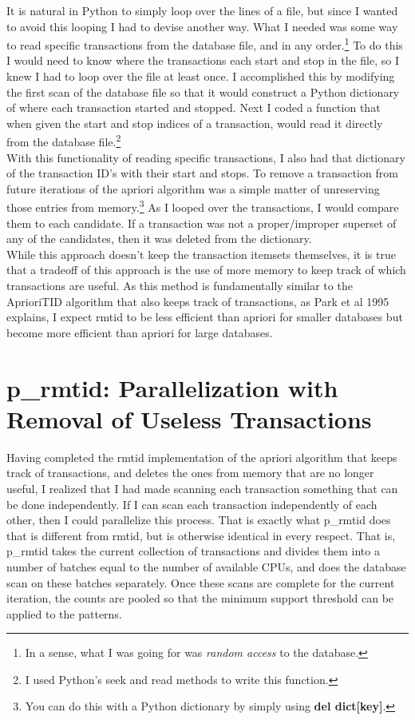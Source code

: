 \documentclass[12 pt]{article}
\begin{document}
It is natural in Python to simply loop over the lines of a file, but since I wanted to avoid this looping I had to devise another way. What I needed was some way to read specific transactions from the database file, and in any order.\footnote{In a sense, what I was going for was \textit{random access} to the database.} To do this I would need to know where the transactions each start and stop in the file, so I knew I had to loop over the file at least once. I accomplished this by modifying the first scan of the database file so that it would construct a Python dictionary of where each transaction started and stopped. Next I coded a function that when given the start and stop indices of a transaction, would read it directly from the database file.\footnote{I used Python's seek and read methods to write this function.}\\

With this functionality of reading specific transactions, I also had that dictionary of the transaction ID's with their start and stops. To remove a transaction from future iterations of the apriori algorithm was a simple matter of unreserving those entries from memory.\footnote{You can do this with a Python dictionary by simply using \textbf{del dict[key]}.} As I looped over the transactions, I would compare them to each candidate. If a transaction was not a proper/improper superset of any of the candidates, then it was deleted from the dictionary.\\

While this approach doesn't keep the transaction itemsets themselves, it is true that a tradeoff of this approach is the use of more memory to keep track of which transactions are useful. As this method is fundamentally similar to the AprioriTID algorithm that also keeps track of transactions, as Park et al 1995 explains, I expect rmtid to be less efficient than apriori for smaller databases but become more efficient than apriori for large databases.\cite{Park1995}

\section{p\_rmtid: Parallelization with Removal of Useless Transactions}

Having completed the rmtid implementation of the apriori algorithm that keeps track of transactions, and deletes the ones from memory that are no longer useful, I realized that I had made scanning each transaction something that can be done independently. If I can scan each transaction independently of each other, then I could parallelize this process. That is exactly what p\_rmtid does that is different from rmtid, but is otherwise identical in every respect. That is, p\_rmtid takes the current collection of transactions and divides them into a number of batches equal to the number of available CPUs, and does the database scan on these batches separately. Once these scans are complete for the current iteration, the counts are pooled so that the minimum support threshold can be applied to the patterns.
\end{document}
